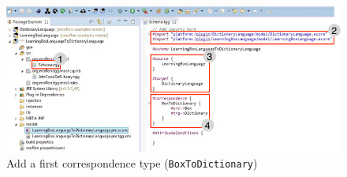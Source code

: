 \begin{figure}[htbp]
\begin{center}
  \includegraphics[width=\textwidth]{../../org.moflon.doc.handbook.04_tripleGraphTransformations/3_schema/newSchema}
  \caption{Add a first correspondence type (\texttt{BoxToDictionary})}  
  \label{newSchema}
\end{center}
\end{figure}
